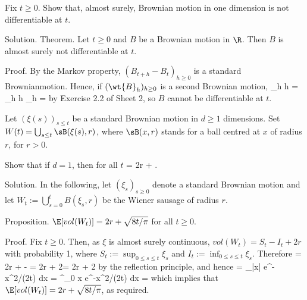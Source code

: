 \item Fix $t \geq 0$. Show that, almost surely, Brownian motion in one dimension is not differentiable at $t$.

\scutline

Solution. Theorem. Let $t \geq 0$ and $B$ be a Brownian motion in $\R$. Then $B$ is almost surely not differentiable at $t$.

Proof. By the Markov property, $(B_{t+h} -B_t)_{h\geq0}$ is a standard Brownianmotion. Hence, if $(\wt{B}_h)_{h\geq0}$ is a second Brownian motion,
\be
\limsup_{h} h = \limsup_{h} h \geq \limsup_{h}  = \infty {}
\ee
by Exercise 2.2 of Sheet 2, so $B$ cannot be differentiable at $t$.

\vspace{2mm}

\qcutline


\item Let $(\xi(s))_{s\leq t}$ be a standard Brownian motion in $d \geq 1$ dimensions. Set $W(t) = \bigcup_{s\leq t}\sB(\xi(s), r)$, where $\sB(x, r)$ stands for a ball centred at $x$ of radius $r$, for $r > 0$.

Show that if $d = 1$, then for all $t$
\be
\E[vol(W(t)] = 2r + .
\ee

\scutline

Solution. In the following, let $(\xi_s)_{s\geq0}$ denote a standard Brownian motion and let $W_t := \bigcup^t_{s=0} B(\xi_s, r)$ be the Wiener sausage of radius $r$.

Proposition. $\E[vol(W_t)] = 2r + \sqrt{8t/\pi}$ for all $t \geq 0$.

Proof. Fix $t \geq 0$. Then, as $\xi$ is almost surely continuous, $vol(W_t) = S_t - I_t + 2r$ with probability 1, where $S_t := \sup_{0\leq s\leq t} \xi_s$ and $I_t := \inf_{0\leq s\leq t} \xi_s$. Therefore
\be
\E[vol(W_t)] = 2r + \E[S_t] - \E[I_t] = 2r + 2\E[S_t] = 2r + 2\E[|B_t|]
\ee
by the reflection principle, and hence
\be
\E[|B_t|] =  \int_\R |x| e^{-x^2/(2t)} dx =  \int^\infty_0 x e^{-x^2/(2t)} dx = 
\ee
which implies that $\E[vol(W_t)] = 2r + \sqrt{8t/\pi}$, as required.

\vspace{2mm}

\qcutline

